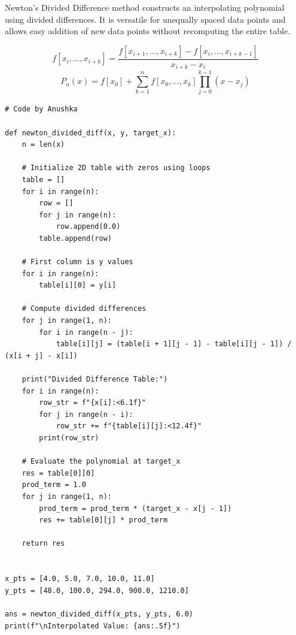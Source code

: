 \documentclass[10pt,a4paper]{report}
\begin{document}
Newton's Divided Difference method constructs an interpolating polynomial using divided differences. It is versatile for unequally spaced data points and allows easy addition of new data points without recomputing the entire table.

\begin{tcolorbox}[colback=theorybg,colframe=theoryframe,title=\textbf{Mathematical Theory \& Formulation},boxrule=1pt,arc=2mm]
\[
f[x_i, \dots, x_{i+k}] = \frac{f[x_{i+1}, \dots, x_{i+k}] - f[x_i, \dots, x_{i+k-1}]}{x_{i+k} - x_i}
\]
\[
P_n(x) = f[x_0] + \sum_{k=1}^n f[x_0, \dots, x_k] \prod_{j=0}^{k-1} (x - x_j)
\]
\end{tcolorbox}

\begin{tcolorbox}[colback=codebg,colframe=secondary,title=\textbf{Python Implementation (Step-by-Step Loops \& Pure Functions)},boxrule=1pt,arc=2mm]
\begin{lstlisting}[style=python_detailed]
# Code by Anushka

def newton_divided_diff(x, y, target_x):
    n = len(x)

    # Initialize 2D table with zeros using loops
    table = []
    for i in range(n):
        row = []
        for j in range(n):
            row.append(0.0)
        table.append(row)

    # First column is y values
    for i in range(n):
        table[i][0] = y[i]

    # Compute divided differences
    for j in range(1, n):
        for i in range(n - j):
            table[i][j] = (table[i + 1][j - 1] - table[i][j - 1]) / (x[i + j] - x[i])

    print("Divided Difference Table:")
    for i in range(n):
        row_str = f"{x[i]:<6.1f}"
        for j in range(n - i):
            row_str += f"{table[i][j]:<12.4f}"
        print(row_str)

    # Evaluate the polynomial at target_x
    res = table[0][0]
    prod_term = 1.0
    for j in range(1, n):
        prod_term = prod_term * (target_x - x[j - 1])
        res += table[0][j] * prod_term

    return res


x_pts = [4.0, 5.0, 7.0, 10.0, 11.0]
y_pts = [48.0, 100.0, 294.0, 900.0, 1210.0]

ans = newton_divided_diff(x_pts, y_pts, 6.0)
print(f"\nInterpolated Value: {ans:.5f}")

\end{lstlisting}
\end{tcolorbox}
\end{document}
